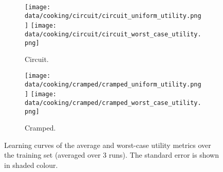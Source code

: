 \begin{figure}
    \centering
    \begin{subfigure}[t]{\linewidth}
    \texttt{[image: data/cooking/circuit/circuit\_uniform\_utility.png]}
    \texttt{[image: data/cooking/circuit/circuit\_worst\_case\_utility.png]}
    \caption{Circuit. \label{fig:cooking:learning_curves.circuit}}
    \end{subfigure}
    \begin{subfigure}[t]{\linewidth}
    \texttt{[image: data/cooking/cramped/cramped\_uniform\_utility.png]}
    \texttt{[image: data/cooking/cramped/cramped\_worst\_case\_utility.png]}
    \caption{Cramped.}
    \end{subfigure}
    \caption{Learning curves of the average and worst-case utility metrics over the training set (averaged over 3 runs). The standard error is shown in shaded colour.}
    \label{fig:cooking.learning_curves}
\end{figure}